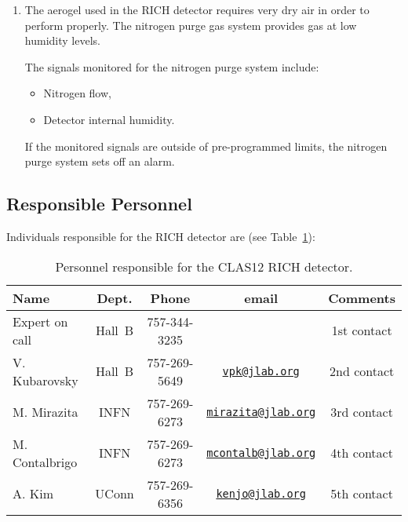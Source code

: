 \begin{enumerate}
\item The aerogel used in the RICH detector requires very dry air in order to perform properly. The 
nitrogen purge gas system provides gas  at low humidity levels.

The signals monitored for the nitrogen purge system include:
\begin{itemize}
\item Nitrogen flow,
\item Detector internal humidity.
\end{itemize}
If the monitored signals are outside of pre-programmed limits, the nitrogen purge system sets off 
an alarm.
\end{enumerate}

\subsection{Responsible Personnel}

Individuals responsible for the RICH detector are (see Table~\ref{tb:rich}):

\begin{table}[!htb]
\centering
\begin{tabular}{|l|c|c|c|c|} \hline
Name&Dept.&Phone&email&Comments \\ \hline
Expert on call & Hall~B & 757-344-3235 & & 1st contact \\ \hline
V. Kubarovsky  & Hall~B & 757-269-5649&\href{mailto:vpk@jlab.org}{\nolinkurl{vpk@jlab.org}}&2nd contact \\ \hline
M. Mirazita    & INFN   & 757-269-6273&\href{mailto:mirazita@jlab.org}{\nolinkurl{mirazita@jlab.org}}& 3rd contact \\ \hline
M. Contalbrigo & INFN   & 757-269-6273&\href{mailto:mcontalb@jlab.org}{\nolinkurl{mcontalb@jlab.org}}& 4th contact \\ \hline
A. Kim         & UConn  & 757-269-6356&\href{mailto:kenjo@jlab.org}{\nolinkurl{kenjo@jlab.org}}& 5th contact \\ \hline
 \end{tabular}
\caption{Personnel responsible for the CLAS12 RICH detector.} 
\label{tb:rich}
\end{table}

